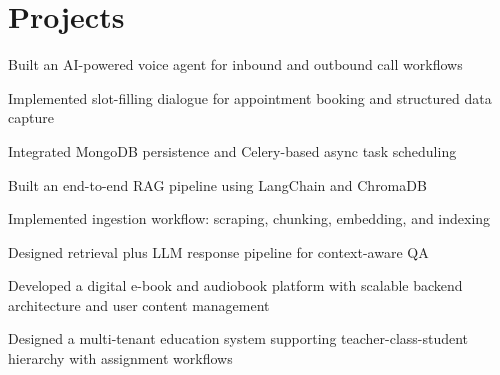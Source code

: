 \documentclass[]{deedy-resume-openfont}
\begin{document}
\begin{minipage}[t]{0.64\textwidth}

\section{Projects}

\begin{tightemize}
\item Built an AI-powered voice agent for inbound and outbound call workflows
\item Implemented slot-filling dialogue for appointment booking and structured data capture
\item Integrated MongoDB persistence and Celery-based async task scheduling
\end{tightemize}
\sectionsep

\begin{tightemize}
\item Built an end-to-end RAG pipeline using LangChain and ChromaDB
\item Implemented ingestion workflow: scraping, chunking, embedding, and indexing
\item Designed retrieval plus LLM response pipeline for context-aware QA
\end{tightemize}
\sectionsep

\begin{tightemize}
\item Developed a digital e-book and audiobook platform with scalable backend architecture and user content management
\end{tightemize}
\sectionsep

\begin{tightemize}
\item Designed a multi-tenant education system supporting teacher-class-student hierarchy with assignment workflows
\end{tightemize}
\sectionsep


\end{minipage}
\end{document}
